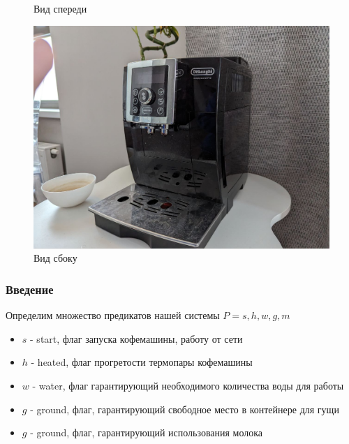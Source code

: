 \documentclass[xcolor={dvipsnames}]{beamer}
\begin{document}
\begin{frame}
\begin{figure}[h!]
\begin{center}
\begin{minipage}[h!]{0.3\linewidth}
        \caption{Вид спереди} 
    \label{} 
    \end{minipage}
\hfill
    \begin{minipage}[h!]{0.4\linewidth}
        \includegraphics[width=1\linewidth]{pics/delonge2.jpg}
        \caption{Вид сбоку}
        \label{}
    \end{minipage}
    \end{center}
\end{figure}

\end{frame}



\begin{frame}
\frametitle{Введение}

Определим множество предикатов нашей системы $P = s, h, w, g, m$

\begin{itemize}
    \item $s$ - start, флаг запуска кофемашины, работу от сети
    \item $h$ - heated, флаг прогретости термопары кофемашины
    \item $w$ - water, флаг гарантирующий необходимого количества воды для работы
    \item $g$ - ground, флаг, гарантирующий свободное место в контейнере для гущи
    \item $g$ - ground, флаг, гарантирующий использования молока
\end{itemize}

\end{frame}
\end{document}
